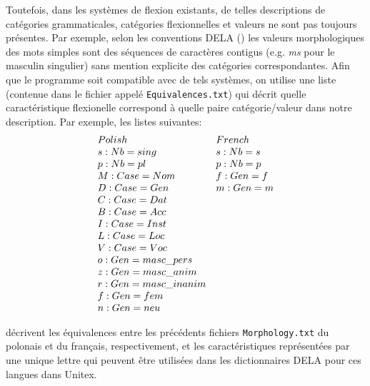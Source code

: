 \bigskip
\noindent Toutefois, dans les systèmes de flexion existants, de telles descriptions de catégories
grammaticales, catégories flexionnelles et valeurs ne sont pas toujours présentes. Par exemple,
selon les conventions DELA (\cite{dicos-francais}) les valeurs morphologiques des mots
simples sont des  séquences de  caractères contigus (e.g. \emph{ms} pour le  masculin singulier)
sans mention explicite des catégories correspondantes. Afin que le programme soit compatible avec de
tels systèmes, on utilise une liste (contenue dans le fichier appelé
\verb+Equivalences.txt+) qui décrit quelle caractéristique flexionelle correspond à quelle paire
catégorie/valeur dans notre description. Par exemple, les listes suivantes:
\[
\begin{array}[c]{ll}
Polish                        &French\\
s: Nb=sing                    &s: Nb=s  \\
p: Nb=pl                      &p: Nb=p \\
M: Case=Nom                   &f: Gen=f  \\
D: Case=Gen                   &m: Gen=m    \\
C: Case=Dat  &\\
B: Case=Acc  &\\
I: Case=Inst  &\\
L: Case=Loc  &\\
V: Case=Voc  &\\
o: Gen=masc\_pers  &\\
z: Gen=masc\_anim  &\\
r: Gen=masc\_inanim  &\\
f: Gen=fem  &\\
n: Gen=neu &
\end{array}
\]

\bigskip
\noindent décrivent les équivalences entre les précédents fichiers \verb+Morphology.txt+
du polonais et du français, respectivement, et les caractéristiques représentées par une unique
lettre qui peuvent être utilisées dans les dictionnaires DELA pour ces langues dans Unitex.

